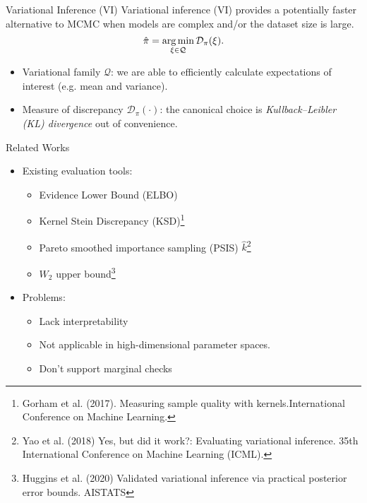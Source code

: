 \documentclass[10pt,xcolor=table]{beamer}
\begin{document}
\begin{frame}{Variational Inference (VI)}
Variational inference (VI) provides a potentially faster alternative to MCMC when models are complex and/or the dataset size is large.
\[
\hat{\posteriorDensity}   = \argmin_{\xi \in \mathcal{Q}} \mathcal{D}_{\posteriorDensity}(\xi).
\]
\begin{itemize}
    \item Variational family $\mathcal{Q}$: we are able to efficiently calculate
expectations of interest (e.g. mean and variance).  
    \item Measure of discrepancy $\mathcal{D}_{\pi}(\cdot)$: the canonical choice is \emph{Kullback--Leibler (KL) divergence} out of convenience. 
\end{itemize}
\end{frame}

\begin{frame}{Related Works}
\begin{itemize}
    \item Existing evaluation tools:
    \begin{itemize}
        \item Evidence Lower Bound (ELBO)
        \item Kernel Stein Discrepancy (KSD)\footnote{Gorham et al. (2017). Measuring sample quality with kernels.International Conference on Machine Learning.}
        \item Pareto smoothed importance sampling (PSIS) $\hat{k}$\footnote{Yao et al. (2018) Yes, but did it work?: Evaluating variational inference. 35th International Conference on Machine Learning (ICML).}
        \item $W_{2}$ upper bound\footnote{Huggins et al. (2020) Validated variational inference via practical posterior error bounds. AISTATS}
    \end{itemize}
    \item Problems:
    \begin{itemize}
        \item Lack interpretability
        \item Not applicable in high-dimensional parameter spaces.
        \item Don't support marginal checks
    \end{itemize}
\end{itemize}
\end{frame}
\end{document}
